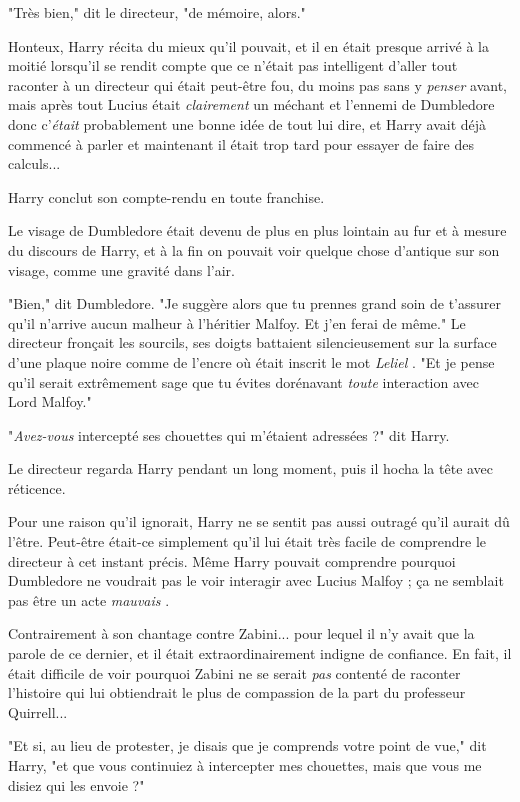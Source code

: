 "Très bien," dit le directeur, "de mémoire, alors."

Honteux, Harry récita du mieux qu'il pouvait, et il en était presque arrivé à la moitié lorsqu'il se rendit compte que ce n'était pas intelligent d'aller tout raconter à un directeur qui était peut-être fou, du moins pas sans y \emph{penser}  avant, mais après tout Lucius était \emph{clairement}  un méchant et l'ennemi de Dumbledore donc c'\emph{était } probablement une bonne idée de tout lui dire, et Harry avait déjà commencé à parler et maintenant il était trop tard pour essayer de faire des calculs...

Harry conclut son compte-rendu en toute franchise.

Le visage de Dumbledore était devenu de plus en plus lointain au fur et à mesure du discours de Harry, et à la fin on pouvait voir quelque chose d'antique sur son visage, comme une gravité dans l'air.

"Bien," dit Dumbledore. "Je suggère alors que tu prennes grand soin de t'assurer qu'il n'arrive aucun malheur à l'héritier Malfoy. Et j'en ferai de même." Le directeur fronçait les sourcils, ses doigts battaient silencieusement sur la surface d'une plaque noire comme de l'encre où était inscrit le mot \emph{Leliel} . "Et je pense qu'il serait extrêmement sage que tu évites dorénavant \emph{toute } interaction avec Lord Malfoy."

"\emph{Avez-vous } intercepté ses chouettes qui m'étaient adressées ?" dit Harry.

Le directeur regarda Harry pendant un long moment, puis il hocha la tête avec réticence.

Pour une raison qu'il ignorait, Harry ne se sentit pas aussi outragé qu'il aurait dû l'être. Peut-être était-ce simplement qu'il lui était très facile de comprendre le directeur à cet instant précis. Même Harry pouvait comprendre pourquoi Dumbledore ne voudrait pas le voir interagir avec Lucius Malfoy ; ça ne semblait pas être un acte \emph{mauvais} .

Contrairement à son chantage contre Zabini... pour lequel il n'y avait que la parole de ce dernier, et il était extraordinairement indigne de confiance. En fait, il était difficile de voir pourquoi Zabini ne se serait \emph{pas } contenté de raconter l'histoire qui lui obtiendrait le plus de compassion de la part du professeur Quirrell...

"Et si, au lieu de protester, je disais que je comprends votre point de vue," dit Harry, "et que vous continuiez à intercepter mes chouettes, mais que vous me disiez qui les envoie ?"

